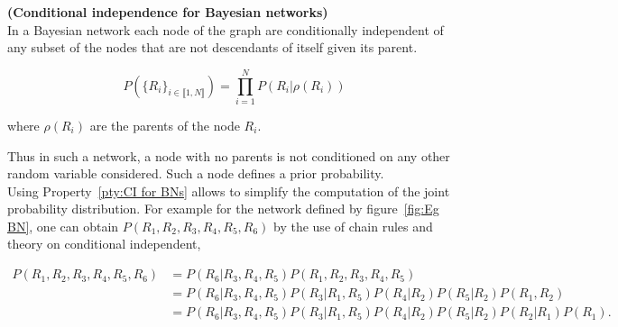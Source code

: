 \documentclass[a4paper,11pt]{report}
\begin{document}
			\begin{prop} \textbf{(Conditional independence for Bayesian networks)}\\ 
				In a Bayesian network each node of the graph are conditionally independent of any subset of the nodes that are not descendants of itself given its parent.
				
				\begin{equation}
				  P(\{R_{i}\}_{i \in \llbracket1,N \rrbracket}) = \prod_{i=1}^{N} P(R_{i} | \rho(R_{i}))
				  \label{eq:BN CI}
				\end{equation}
				
				where $\rho(R_{i})$ are the parents of the node $R_{i}$. 
				\label{pty:CI for BNs}
			\end{prop}
			
			Thus in such a network, a node with no parents is not conditioned on any other random variable considered. Such a node defines a prior probability.\\

			Using Property~\ref{pty:CI for BNs} allows to simplify the computation of the joint probability distribution. For example for the network defined by figure~\ref{fig:Eg BN}, one can obtain $P(R_{1},R_{2},R_{3},R_{4},R_{5},R_{6})$ by the use of chain rules and theory on conditional independent,
			
			\begin{equation*}
			  \begin{split}
			    P(R_{1},R_{2},R_{3},R_{4},R_{5},R_{6})
						&= P(R_{6} | R_{3},R_{4},R_{5}) P(R_{1},R_{2},R_{3},R_{4},R_{5}) \\
						&= P(R_{6} | R_{3},R_{4},R_{5}) P(R_{3} | R_{1},R_{5}) P(R_{4}| R_{2}) P(R_{5}| R_{2}) P(R_{1},R_{2})\\
						&= P(R_{6} | R_{3},R_{4},R_{5}) P(R_{3} | R_{1},R_{5}) P(R_{4}| R_{2}) P(R_{5}| R_{2}) P(R_{2}|R_{1}) P(R_{1}).\\
			  \end{split}
			  \label{eq:Eg BN CI}
			\end{equation*}
      
\end{document}
